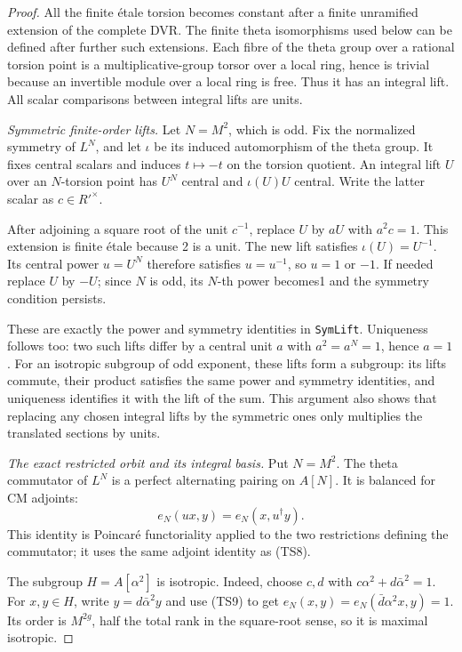\begin{proof}
All the finite étale torsion becomes constant after a finite unramified extension of the complete DVR. The finite theta isomorphisms used below can be defined after further such extensions. Each fibre of the theta group over a rational torsion point is a multiplicative-group torsor over a local ring, hence is trivial because an invertible module over a local ring is free. Thus it has an integral lift. All scalar comparisons between integral lifts are units.

\emph{Symmetric finite-order lifts.}
Let \(N=M^2\), which is odd. Fix the normalized symmetry of \(L^N\), and let \(\iota\) be its induced automorphism of the theta group. It fixes central scalars and induces \(t\mapsto-t\) on the torsion quotient. An integral lift \(U\) over an \(N\)-torsion point has \(U^N\) central and \(\iota(U)U\) central. Write the latter scalar as \(c\in R'^\times\).

After adjoining a square root of the unit \(c^{-1}\), replace \(U\) by \(aU\) with \(a^2c=1\). This extension is finite étale because 2 is a unit. The new lift satisfies \(\iota(U)=U^{-1}\). Its central power \(u=U^N\) therefore satisfies \(u=u^{-1}\), so \(u=1\) or \(-1\). If needed replace \(U\) by \(-U\); since \(N\) is odd, its \(N\)-th power becomes1 and the symmetry condition persists.

These are exactly the power and symmetry identities in \texttt{SymLift}. Uniqueness follows too: two such lifts differ by a central unit \(a\) with \(a^2=a^N=1\), hence \(a=1\). For an isotropic subgroup of odd exponent, these lifts form a subgroup: its lifts commute, their product satisfies the same power and symmetry identities, and uniqueness identifies it with the lift of the sum. This argument also shows that replacing any chosen integral lifts by the symmetric ones only multiplies the translated sections by units.

\emph{The exact restricted orbit and its integral basis.}
Put \(N=M^2\). The theta commutator of \(L^N\) is a perfect alternating pairing on \(A[N]\). It is balanced for CM adjoints: \[
 e_N(u x,y)=e_N(x,u^\dagger y).
 \tag{TS9}
\] This identity is Poincaré functoriality applied to the two restrictions defining the commutator; it uses the same adjoint identity as (TS8).

The subgroup \(H=A[\alpha^2]\) is isotropic. Indeed, choose \(c,d\) with \(c\alpha^2+d\bar\alpha^2=1\). For \(x,y\in H\), write \(y=d\bar\alpha^2y\) and use (TS9) to get \(e_N(x,y)=e_N(\bar d\alpha^2x,y)=1\). Its order is \(M^{2g}\), half the total rank in the square-root sense, so it is maximal isotropic.


\end{proof}
